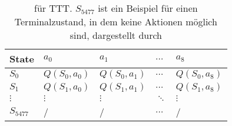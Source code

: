 \begin{table}
\centering
\caption[Q-Tabelle für \acs{TTT}]{\qtable für \acs{TTT}. $S_{5477}$ ist ein Beispiel für einen Terminalzustand, in dem keine Aktionen möglich sind, dargestellt durch \gqq{/}}
\label{tab:qtable_example}
\begin{tabular}{lllll}
\toprule
State       &   $a_0$           &   $a_1$       & $\dots$   & $a_8$         \\ \midrule
$S_0$       &   $Q(S_0,a_0)$    &  $Q(S_0,a_1)$ & $\dots$   & $Q(S_0,a_8)$  \\
$S_1$       &   $Q(S_1,a_0)$    &  $Q(S_1,a_1)$ & $\dots$   & $Q(S_1,a_8)$  \\
$\vdots$    & $\vdots$          & $\vdots$      & $\ddots$  & $\vdots$      \\
$S_ {5477}$    &  /                 &  /           & $\dots$   & /  \\ \bottomrule
\end{tabular}
\end{table}
